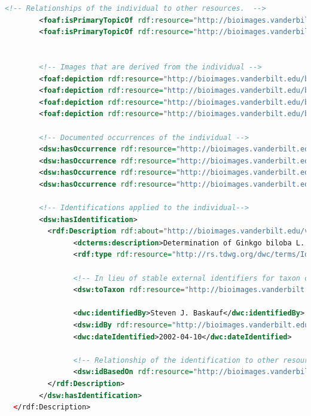 \begin{appendices}
\begin{lstlisting}[language=XML, caption={Darwin-SW Representation of a Living Specimen}]
        <!-- Relationships of the individual to other resources.  -->
        <foaf:isPrimaryTopicOf rdf:resource="http://bioimages.vanderbilt.edu/vanderbilt/12-126.rdf" />
        <foaf:isPrimaryTopicOf rdf:resource="http://bioimages.vanderbilt.edu/vanderbilt/12-126.htm" />

        
        <!-- Images that are derived from the individual -->
        <foaf:depiction rdf:resource="http://bioimages.vanderbilt.edu/baskauf/10502"/>
        <foaf:depiction rdf:resource="http://bioimages.vanderbilt.edu/baskauf/10557"/>
        <foaf:depiction rdf:resource="http://bioimages.vanderbilt.edu/baskauf/10556"/>
        <foaf:depiction rdf:resource="http://bioimages.vanderbilt.edu/baskauf/10554"/>
        
        <!-- Documented occurrences of the individual -->
        <dsw:hasOccurrence rdf:resource="http://bioimages.vanderbilt.edu/baskauf/10502#occ" />
        <dsw:hasOccurrence rdf:resource="http://bioimages.vanderbilt.edu/baskauf/10557#occ" />
        <dsw:hasOccurrence rdf:resource="http://bioimages.vanderbilt.edu/baskauf/10556#occ" />
        <dsw:hasOccurrence rdf:resource="http://bioimages.vanderbilt.edu/baskauf/10554#occ" />
        
        <!-- Identifications applied to the individual-->
        <dsw:hasIdentification>
          <rdf:Description rdf:about="http://bioimages.vanderbilt.edu/vanderbilt/12-126#2002-04-10baskauf">
                <dcterms:description>Determination of Ginkgo biloba L. sensu Flora of North America (1993) for the individual http://bioimages.vanderbilt.edu/vanderbilt/12-126</dcterms:description>
                <rdf:type rdf:resource="http://rs.tdwg.org/dwc/terms/Identification" />

                <!-- In lieu of stable external identifiers for taxon concepts, Im defining some onsite -->
				<dsw:toTaxon rdf:resource="http://bioimages.vanderbilt.edu/taxonConcepts#183269-fna1993" />
                
				<dwc:identifiedBy>Steven J. Baskauf</dwc:identifiedBy>
                <dsw:idBy rdf:resource="http://bioimages.vanderbilt.edu/contact/baskauf" />
				<dwc:dateIdentified>2002-04-10</dwc:dateIdentified>
                
				<!-- Relationship of the identification to other resources -->
				<dsw:idBasedOn rdf:resource="http://bioimages.vanderbilt.edu/baskauf/10554"/>
          </rdf:Description>
        </dsw:hasIdentification>
  </rdf:Description>


\end{lstlisting}
\end{appendices}
